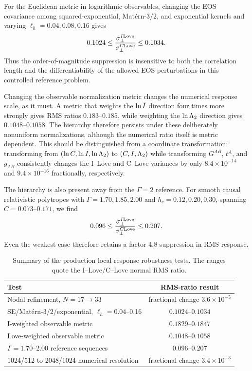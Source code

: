 For the Euclidean metric in logarithmic observables, changing the EOS
covariance among squared-exponential, Mat\'ern-\(3/2\), and exponential
kernels and varying \(\ell_h=0.04,0.08,0.16\) gives
\begin{equation}
    0.1024
    \le
    \frac{\sigma_\perp^{I{\rm Love}}}
         {\sigma_\perp^{C{\rm Love}}}
    \le
    0.1034.
    \label{eq:kernel-robustness}
\end{equation}
Thus the order-of-magnitude suppression is insensitive to both the
correlation length and the differentiability of the allowed EOS
perturbations in this controlled reference problem.

Changing the observable normalization metric changes the numerical response
scale, as it must.  A metric that weights the \(\ln\bar I\) direction four
times more strongly gives RMS ratios \(0.183\)--\(0.185\), while weighting
the \(\ln\Lambda_2\) direction gives \(0.1048\)--\(0.1058\).  The hierarchy
therefore persists under these deliberately nonuniform normalizations,
although the numerical ratio itself is metric dependent.  This should be
distinguished from a coordinate transformation: transforming from
\((\ln C,\ln\bar I,\ln\Lambda_2)\) to
\((C,\bar I,\Lambda_2)\) while transforming \(G^{AB}\), \(t^A\), and \(g_{AB}\)
consistently changes the I--Love and C--Love variances by only
\(8.4\times10^{-14}\) and \(9.4\times10^{-16}\) fractionally, respectively.

The hierarchy is also present away from the \(\Gamma=2\) reference.  For
smooth causal relativistic polytropes with
\(\Gamma=1.70,1.85,2.00\) and \(h_c=0.12,0.20,0.30\), spanning
\(C=0.073\)--\(0.171\), we find
\begin{equation}
    0.096
    \le
    \frac{\sigma_\perp^{I{\rm Love}}}
         {\sigma_\perp^{C{\rm Love}}}
    \le
    0.207.
    \label{eq:reference-robustness}
\end{equation}
Even the weakest case therefore retains a factor \(4.8\) suppression in
RMS response.

\begin{table}[t]
\caption{Summary of the production local-response robustness tests.  The
ranges quote the I--Love/C--Love normal RMS ratio.}
\label{tab:response-robustness}
\begin{ruledtabular}
\begin{tabular}{lc}
Test & RMS-ratio result\\
\hline
Nodal refinement, \(N=17\rightarrow33\)
& fractional change \(3.6\times10^{-5}\)\\
SE/Mat\'ern-3/2/exponential, \(\ell_h=0.04\)--0.16
& \(0.1024\)--\(0.1034\)\\
I-weighted observable metric
& \(0.1829\)--\(0.1847\)\\
Love-weighted observable metric
& \(0.1048\)--\(0.1058\)\\
\(\Gamma=1.70\)--2.00 reference sequences
& \(0.096\)--\(0.207\)\\
1024/512 to 2048/1024 numerical resolution
& fractional change \(3.4\times10^{-3}\)
\end{tabular}
\end{ruledtabular}
\end{table}

